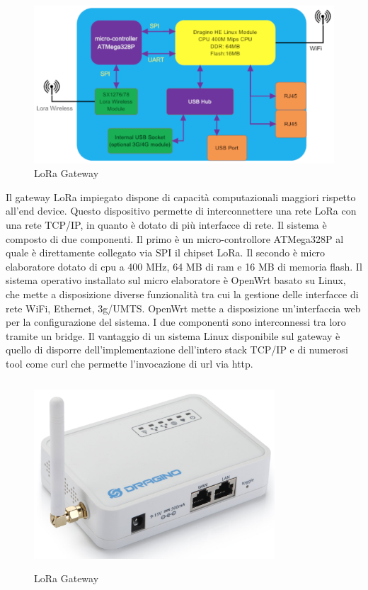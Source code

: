\documentclass[12pt,a4paper,openright,twoside]{report}
\begin{document}
\begin{figure}[h]                      
\begin{center} 
\includegraphics[width=\textwidth]{LoRa_Gateway_Spec.png}
\caption[LoRa Gateway]{LoRa Gateway}\label{fig:prima}
\end{center}
\end{figure}

Il gateway LoRa impiegato dispone di capacit\`a computazionali maggiori rispetto all'end device. 
Questo dispositivo permette di interconnettere una rete LoRa con una rete TCP/IP, in quanto \`e dotato di pi\`u interfacce di rete. Il sistema \`e composto di due componenti. Il primo \`e un micro-controllore ATMega328P al quale \`e direttamente collegato via SPI il chipset LoRa. Il secondo \`e micro elaboratore dotato di cpu a 400 MHz, 64 MB di ram e 16 MB di memoria flash. Il sistema operativo installato sul micro elaboratore \`e OpenWrt basato su Linux, che mette a disposizione diverse funzionalit\`a tra cui la gestione delle interfacce di rete WiFi, Ethernet, 3g/UMTS. OpenWrt mette a disposizione un'interfaccia web per la configurazione del sistema. I due componenti sono interconnessi tra loro tramite un bridge. Il vantaggio di un sistema Linux disponibile sul gateway \`e quello di disporre dell'implementazione dell'intero stack TCP/IP e di numerosi tool come curl che permette l'invocazione di url via http.


\begin{figure}[h]                      
\begin{center} 
\includegraphics[width=90mm,height=70mm]{LoRa_dragino_GW.png}
\caption[LoRa Gateway]{LoRa Gateway}
\end{center}
\end{figure}
\end{document}
